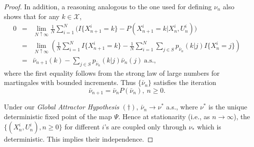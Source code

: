 \documentclass[10pt,a4paper]{amsart}
\newcommand{\X}{\mathcal{X}}
\begin{document}
\begin{proof}
In addition, a reasoning analogous to the one used for defining $\nu_n$ also shows that for any $k \in \X$,
\begin{eqnarray*}
0 &=&\lim_{N\uparrow\infty}\frac{1}{N}\sum_{i=1}^N\Big(I\{X^i_{n+1} = k\} - P(X^i_{n+1} = k|X^i_n, U^i_n)\Big) \\
&=& \lim_{N\uparrow\infty}\left(\frac{1}{N}\sum_{i=1}^NI\{X^i_{n+1} = k\} - \frac{1}{N}\sum_{i=1}^N\sum_{j\in S}p_{\bar{\nu}_n}(k|j)I\{X^i_n=j\}\right) \\
&=& \bar{\nu}_{n+1}(k) - \sum_{j\in S}p_{\bar{\nu}_n}(k|j)\bar{\nu}_n(j)  \   \mbox{a.s.}, 
\end{eqnarray*}
where the first equality follows from the strong law of large numbers for martingales with bounded increments. 
Thus $\{\bar{\nu}_n\}$ satisfies the iteration
\begin{equation}
\bar{\nu}_{n+1} = \bar{\nu}_nP(\bar{\nu}_n), \ n \geq 0. \label{nuiteration}
\end{equation}

Under our \textit{Global Attractor Hypothesis} \textbf{$(\dagger)$},  $\bar{\nu}_n \to \nu^*$ a.s., where $\nu^*$ is the unique deterministic fixed point of the map $\Psi$. Hence at stationarity (i.e., as $n\to\infty$), the $\{(X^i_n, U^i_n), n \geq 0\}$ for different $i$'s are coupled only through $\nu_*$ which is deterministic. This implies their independence.
\end{proof}
\end{document}
